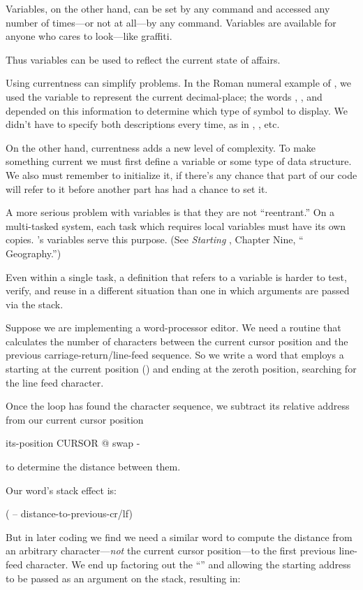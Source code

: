 Variables, on the other hand, can be set by any command and accessed
any number of times---or not at all---by any command. Variables
are available for anyone who cares to look---like graffiti.

Thus variables can be used to reflect the current state of affairs.

Using currentness can simplify problems. In the Roman numeral example
of , we used the variable  to represent the
current decimal-place; the words , , and
 depended on this information to determine which type of
symbol to display. We didn't have to specify both descriptions every
time, as in , , etc.

On the other hand, currentness adds a new level of complexity. To make
something current we must first define a variable or some type of data
structure. We also must remember to initialize it, if there's any chance
that part of our code will refer to it before another part has had a
chance to set it.

A more serious problem with variables is that they are not ``reentrant.''
On a multi-tasked \Forth{} system, each task which requires local
variables must have its own copies. \Forth{}'s  variables
serve this purpose. (See \emph{Starting \Forth{}}, Chapter Nine,
``\Forth{} Geography.'')

Even within a single task, a definition that refers to a variable is
harder to test, verify, and reuse in a different situation than one in
which arguments are passed via the stack.

Suppose we are implementing a word-processor editor. We need a routine
that calculates the number of characters between the current cursor
position and the previous carriage-return/line-feed sequence. So we write
a word that employs a  starting at the current
position () and ending at the zeroth position, searching
for the line feed character.

Once the loop has found the character sequence, we subtract its
relative address from our current cursor position

\begin{Code}
its-position CURSOR @  swap -
\end{Code}
to determine the distance between them.

Our word's stack effect is:

\begin{Code}
( -- distance-to-previous-cr/lf)
\end{Code}
But in later coding we find we need a similar word to compute the distance
from an arbitrary character---\emph{not} the current cursor position---to
the first previous line-feed character. We end up factoring out the
``'' and allowing the starting address to be passed as an
argument on the stack, resulting in:

